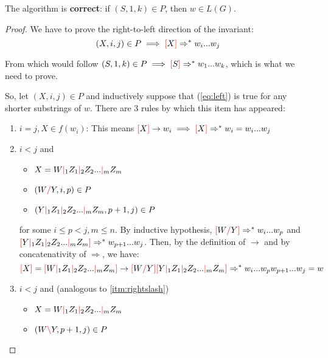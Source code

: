 \documentclass[main.tex]{subfiles}
\begin{document}
\begin{prop}
    The algorithm is \textbf{correct}: if $(S, 1, k) \in P$, then $w \in L(G)$.
\end{prop}
\begin{proof}
    We have to prove the right-to-left direction of the invariant:
    \begin{equation}\label{eq:left}
        (X, i, j) \in P \implies \textcolor{red}{[} X \textcolor{red}{]} \Rightarrow^* w_i ... w_j
    \end{equation}

    From which would follow $ (S, 1, k) \in P \implies \textcolor{red}{[} S \textcolor{red}{]} \Rightarrow^* w_1 ... w_k$,
    which is what we need to prove.

    So, let $(X, i, j) \in P$ and inductively suppose that (\ref{eq:left}) is true
    for any shorter substrings of $w$. There are 3 rules by which this item has appeared:
    \begin{enumerate}
        \item $i = j, X \in f(w_i)$: This means
            $\textcolor{red}{[} X \textcolor{red}{]} \rightarrow w_i \implies \textcolor{red}{[} X \textcolor{red}{]} \Rightarrow^* w_i = w_i ... w_j$
        \item \label{itm:rightslash} $i < j$ and
            \begin{itemize}
                \item $X = W \textcolor{red}{|}_1 Z_1 \textcolor{red}{|}_2 Z_2 ... \textcolor{red}{|}_m Z_m$
                \item $(W \textcolor{red}{/} Y, i, p) \in P$
                \item $(Y \textcolor{red}{|}_1 Z_1 \textcolor{red}{|}_2 Z_2 ... \textcolor{red}{|}_m Z_m, p + 1, j) \in P$
            \end{itemize}
            for some $i \leq p < j, m \leq n$. By inductive hypothesis,
            $\textcolor{red}{[} W \textcolor{red}{/} Y \textcolor{red}{]} \Rightarrow^* w_i ... w_p$
            and
            $\textcolor{red}{[} Y \textcolor{red}{|}_1 Z_1 \textcolor{red}{|}_2 Z_2 ... \textcolor{red}{|}_m Z_m \textcolor{red}{]} \Rightarrow^* w_{p + 1} ... w_j$.
            Then, by the definition of $\rightarrow$ and by concatenativity of
            $\Rightarrow$, we have:
            \[
                \textcolor{red}{[} X \textcolor{red}{]} = \textcolor{red}{[} W \textcolor{red}{|}_1 Z_1 \textcolor{red}{|}_2 Z_2 ... \textcolor{red}{|}_m Z_m \textcolor{red}{]}
                \rightarrow
                \textcolor{red}{[} W \textcolor{red}{/} Y \textcolor{red}{]} \textcolor{red}{[} Y \textcolor{red}{|}_1 Z_1 \textcolor{red}{|}_2 Z_2 ... \textcolor{red}{|}_m Z_m \textcolor{red}{]}
                \Rightarrow^*
                w_i ... w_p w_{p + 1} ... w_j = w
            \]
        \item $i < j$ and (analogous to \ref{itm:rightslash})
            \begin{itemize}
                \item $X = W \textcolor{red}{|}_1 Z_1 \textcolor{red}{|}_2 Z_2 ... \textcolor{red}{|}_m Z_m$
                \item $(W \textcolor{red}{\backslash} Y, p + 1, j) \in P$

\end{itemize}
\end{enumerate}
\end{proof}
\end{document}
